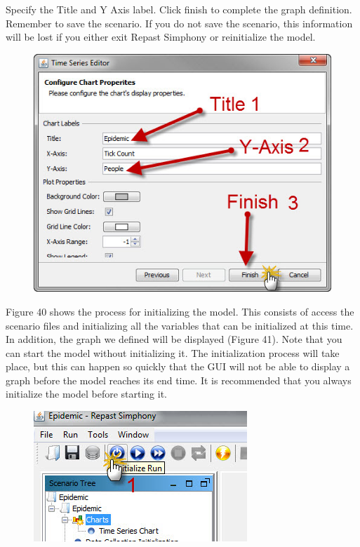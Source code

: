\documentclass[11pt]{amsart}
\begin{document}
Specify the Title and Y Axis label. Click finish to complete the graph definition. Remember to save the scenario. If you do not save the scenario, this information will be lost if you either exit Repast Simphony or reinitialize the model.

\begin{figure}[ht]
\begin{center}
\vspace{.2in}
\centerline {
\includegraphics[totalheight=0.3\textheight]{images/039.jpg}
}
\caption{}
\label{fig:039}
\end{center}
\end{figure}

Figure 40 shows the process for initializing the model. This consists of access the scenario files and initializing all the variables that can be initialized at this time. In addition, the graph we defined will be displayed (Figure 41). Note that you can start the model without initializing it. The initialization process will take place, but this can happen so quickly that the GUI will not be able to display a graph before the model reaches its end time. It is recommended that you always initialize the model before starting it.


\begin{figure}[ht]
\begin{center}
\vspace{.2in}
\centerline {
\includegraphics[totalheight=0.3\textheight]{images/040.jpg}
}
\caption{}
\label{fig:040}
\end{center}
\end{figure}
\end{document}
